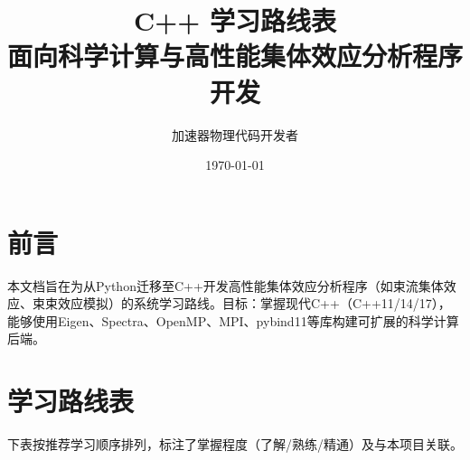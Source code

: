 \documentclass[12pt,a4paper]{article}
\title{\textbf{C++ 学习路线表}\\面向科学计算与高性能集体效应分析程序开发}
\author{加速器物理代码开发者}
\date{\today}
\begin{document}
\maketitle

\section*{前言}
本文档旨在为从Python迁移至C++开发高性能集体效应分析程序（如束流集体效应、束束效应模拟）的系统学习路线。目标：掌握现代C++（C++11/14/17），能够使用Eigen、Spectra、OpenMP、MPI、pybind11等库构建可扩展的科学计算后端。

\section{学习路线表}
下表按推荐学习顺序排列，标注了掌握程度（了解/熟练/精通）及与本项目关联。
\end{document}
